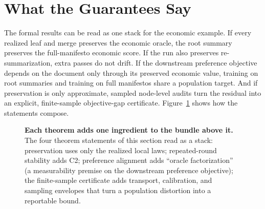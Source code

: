 \section{What the Guarantees Say}\label{sec:min-guarantees}

The formal results can be read as one stack for the economic example.
If every realized leaf and merge preserves the economic oracle, the
root summary preserves the full-manifesto economic score. If the run
also preserves re-summarization, extra passes do not drift. If the
downstream preference objective depends on the document only through
its preserved economic value, training on root summaries and training
on full manifestos share a population target. And if preservation is
only approximate, sampled node-level audits turn the residual into an
explicit, finite-sample objective-gap certificate.
Figure~\ref{fig:min-theorem-deps} shows how the statements compose.

\begin{figure}[t]
    \centering
    \caption{\textbf{Each theorem adds one ingredient to the bundle
    above it.} The four theorem statements of this section read as a
    stack: preservation uses only the realized local laws; repeated-round
    stability adds C2; preference alignment adds ``oracle factorization''
    (a measurability premise on the downstream preference objective);
    the finite-sample certificate adds transport, calibration, and
    sampling envelopes that turn a population distortion into a
    reportable bound.}
    \label{fig:min-theorem-deps}
\end{figure}

